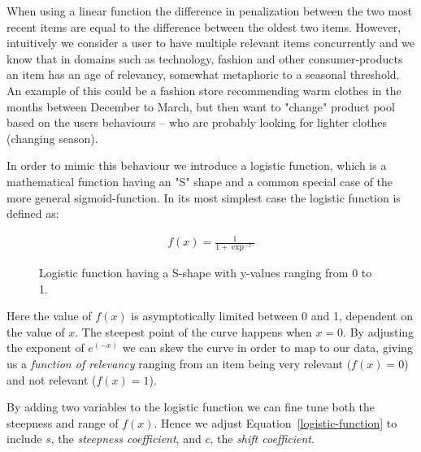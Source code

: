 When using a linear function the difference in penalization between the two
most recent items are equal to the difference between the oldest two items.
However, intuitively we consider a user to have multiple relevant items
concurrently and we know that in domains such as technology, fashion and other
consumer-products an item has an age of relevancy, somewhat metaphoric to a
seasonal threshold. An example of this could be a fashion store recommending
warm clothes in the months between December to March, but then want to "change"
product pool based on the users behaviours -- who are probably looking for
lighter clothes (changing season).

In order to mimic this behaviour we introduce a logistic function, which is a
mathematical function having an "S" shape and a common special case of the more
general sigmoid-function. In its most simplest case the logistic function is
defined as:

\begin{figure}[H]
  \centering
  \noindent\begin{minipage}{.45\textwidth}
  \end{minipage}
  \begin{minipage}{.45\textwidth}
  \begin{align}
    \label{logistic-function}
    f(x) = \frac{1}{1+\exp^{-x}}
  \end{align}
  \end{minipage}
  \caption{Logistic function having a S-shape with y-values ranging
  from 0 to 1.}
\end{figure}

Here the value of $f(x)$ is asymptotically limited between 0 and 1, dependent
on the value of $x$. The steepest point of the curve happens when $x=0$. By
adjusting the exponent of $e^{(-x)}$ we can skew the curve in order to map to our
data, giving us a \textit{function of relevancy} ranging from an item being
very relevant ($f(x)=0$) and not relevant ($f(x)=1$).

By adding two variables to the logistic function we can fine tune both the
steepness and range of $f(x)$. Hence we adjust Equation~\ref{logistic-function}
to include $s$, the \textit{steepness coefficient}, and $c$, the \textit{shift
coefficient}.

